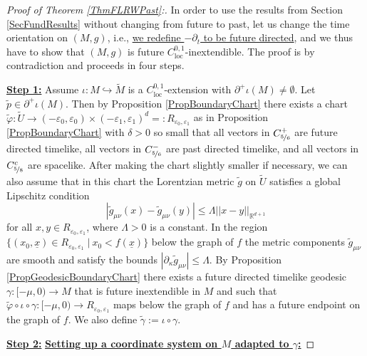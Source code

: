 \documentclass[reqno]{article}
\newcommand{\R}{\mathbb{R}}
\newcommand{\loc}{\mathrm{loc}}
\newcommand{\Reps}{R_{\varepsilon_0, \varepsilon_1}}
\begin{document}
\begin{proof}[Proof of Theorem \ref{ThmFLRWPast}:]
In order to use the results from Section \ref{SecFundResults} without changing from future to past, let us change the time orientation on $(M,g)$, i.e., \underline{we redefine $-\partial_t$ to be future directed}, and we thus have to show that $(M,g)$ is future $C^{0,1}_{\loc}$-inextendible.  The proof is by contradiction and proceeds in four steps.
\newline

\underline{\textbf{Step 1:}} Assume $\iota : M \hookrightarrow \tilde{M}$ is a $C^{0,1}_{\loc}$-extension with $\partial^+ \iota(M) \neq \emptyset$. Let $\tilde{p} \in \partial^+ \iota(M)$. Then by Proposition \ref{PropBoundaryChart} there exists a chart $\tilde{\varphi} : \tilde{U} \to(-\varepsilon_0, \varepsilon_0) \times  (-\varepsilon_1, \varepsilon_1)^{d} =: R_{\varepsilon_0, \varepsilon_1}$ as in Proposition \ref{PropBoundaryChart} with $\delta >0$ so small that all vectors in $C^+_{\nicefrac{5}{6}}$ are future directed timelike, all vectors in $C^-_{\nicefrac{5}{6}}$ are past directed timelike, and all vectors in $C^c_{\nicefrac{5}{8}}$ are spacelike. After making the chart slightly smaller if necessary, we can also assume that in this chart the Lorentzian metric $\tilde{g}$ on $\tilde{U}$ satisfies a global Lipschitz condition
\begin{equation*}
|\tilde{g}_{\mu \nu}(x) - \tilde{g}_{\mu \nu}(y)| \leq \Lambda ||x - y||_{\R^{d+1}} 
\end{equation*}
for all $x,y \in \Reps$, where $\Lambda >0$ is a constant. In the region $\{(x_0,\underline{x}) \in \Reps \; | \: x_0 < f(\underline{x})\}$ below the graph of $f$ the metric components $\tilde{g}_{\mu \nu}$ are smooth and satisfy the bounds $|\partial_\kappa \tilde{g}_{\mu \nu}| \leq \Lambda$. By Proposition \ref{PropGeodesicBoundaryChart} there exists a future directed timelike  geodesic $\gamma : [-\mu,0) \to M$ that is future inextendible in $M$ and such that $\tilde{\varphi} \circ \iota \circ \gamma :[-\mu,0) \to \Reps$ maps below the graph of $f$ and has a future endpoint on the graph of $f$. We also define $\tilde{\gamma} := \iota \circ \gamma$.
\newline



\underline{\textbf{Step 2:}} \underline{\textbf{Setting up a coordinate system on $M$ adapted to $\gamma$:}} 


\end{proof}
\end{document}
